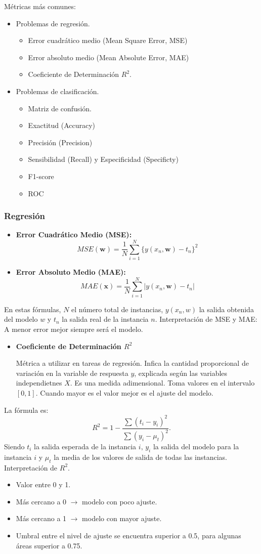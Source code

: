 Métricas más comunes:
\begin{itemize}
	\item Problemas de regresión.
	\begin{itemize}
		\item Error cuadrático medio (Mean Square Error, MSE)
		\item Error absoluto medio (Mean Absolute Error, MAE)
		\item Coeficiente de Determinación $R^2$.
	\end{itemize}
	\item Problemas de clasificación.
	\begin{itemize}
		\item Matriz de confusión.
		\item Exactitud (Accuracy)
		\item Precisión (Precision)
		\item Sensibilidad (Recall) y Especificidad (Specificty)
		\item F1-score
		\item ROC
	\end{itemize}
\end{itemize}
\subsubsection{Regresión}
\begin{itemize}
	\item \textbf{Error Cuadrático Medio (MSE):} \[ MSE(\mathbf{w})=\dfrac{1}{N}\sum_{i=1}^{N}\{y(x_n,\mathbf{w})-t_n\}^2 \]
	\item \textbf{Error Absoluto Medio (MAE):} \[ MAE(\mathbf{x})=\dfrac{1}{N}\sum_{i=1}^{N}|y(x_n,\mathbf{w})-t_n| \]
\end{itemize}
En estas fórmulas, $N$ el número total de instancias, $y(x_n,w)$ la salida obtenida del modelo $w$ y $t_n$ la salida real de la instancia $n$. Interpretación de MSE y MAE: A menor error mejor siempre será el modelo.
\begin{itemize}
	\item \textbf{Coeficiente de Determinación $R^2$}
	
	Métrica a utilizar en tareas de regresión. Infica la cantidad proporcional de variación en la variable de respuesta $y$, explicada según las variables independietnes $X$. Es una medida adimensional. Toma valores en el intervalo $[0,1]$. Cuando mayor es el valor mejor es el ajuste del modelo.
\end{itemize}
La fórmula es: \[ R^2=1-\dfrac{\sum(t_i-y_i)^2}{\sum(y_i-\mu_t)^2}. \] Siendo $t_i$ la salida esperada de la instancia $i,\,y_i$ la salida del modelo para la instancia $i$ y $\mu_t$ la media de los valores de salida de todas las instancias. Interpretación de $R^2$.
\begin{itemize}
	\item Valor entre 0 y 1.
	\item Más cercano a 0 $\longrightarrow$ modelo con poco ajuste.
	\item Más cercano a 1 $\longrightarrow$ modelo con mayor ajuste.
	\item Umbral entre el nivel de ajuste se encuentra superior a 0.5, para algunas áreas superior a 0.75.
\end{itemize}
